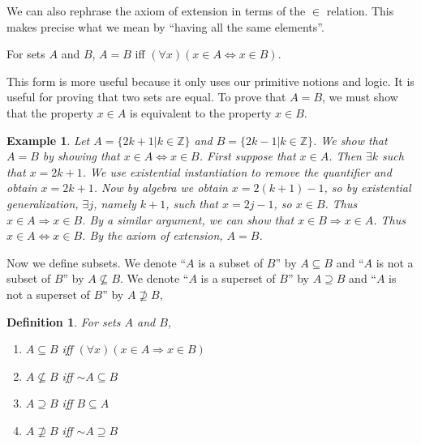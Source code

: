 \documentclass[12pt]{article}
\newenvironment{axm*}
 {\axminner}
 {\endaxminner}
\newcommand*{\oldneg}{\mathord{\sim}}
\newcounter{dfnc}
\newcounter{exc}
\newtheorem{dfn}[dfnc]{Definition}
\newtheorem{ex}[exc]{Example}
\begin{document}


We can also rephrase the axiom of extension in terms of the $\in$
relation.  This makes precise what we mean by ``having all the same
elements''.

\begin{axm*}\label{axm:ext-bicond}
  For sets $A$ and $B$, $A=B$ iff $(\forall x)(x\in A \Leftrightarrow
  x\in B)$.
\end{axm*}

This form is more useful because it only uses our primitive notions
and logic.  It is useful for proving that two sets are equal.  To
prove that $A=B$, we must show that the property $x\in A$ is
equivalent to the property $x\in B$.

\begin{ex}
  Let $A=\{2k+1 | k \in \mathbb{Z}\}$ and $B=\{2k-1 |
  k\in\mathbb{Z}\}$.  We show that $A=B$ by showing that $x\in A
  \Leftrightarrow x\in B$.  First suppose that $x\in A$.  Then
  $\exists k$ such that $x=2k+1$.  We use existential instantiation to
  remove the quantifier and obtain $x=2k+1$.  Now by algebra we obtain
  $x=2(k+1)-1$, so by existential generalization, $\exists j$, namely
  $k+1$, such that $x=2j-1$, so $x\in B$.  Thus $x\in A \Rightarrow
  x\in B$.  By a similar argument, we can show that $x\in B
  \Rightarrow x\in A$.  Thus $x\in A \Leftrightarrow x\in B$.  By the
  axiom of extension, $A=B$.
\end{ex}

Now we define subsets.  We denote ``$A$ is a subset of $B$'' by
$A\subseteq B$ and ``$A$ is not a subset of $B$'' by $A\not\subseteq
B$.  We denote ``$A$ is a superset of $B$'' by $A\supseteq B$ and
``$A$ is not a superset of $B$'' by $A\not\supseteq B$,

\begin{dfn}\label{dfn:subset}
  For sets $A$ and $B$,
  \begin{enumerate}[label=\alph*)]
  \item $A\subseteq B$ iff $(\forall x)(x\in A \Rightarrow x\in B)$
  \item $A\not\subseteq B$ iff $\oldneg A\subseteq B$
  \item $A\supseteq B$ iff $B\subseteq A$
  \item $A\not\supseteq B$ iff $\oldneg A\supseteq B$
  \end{enumerate}
\end{dfn}
\end{document}
